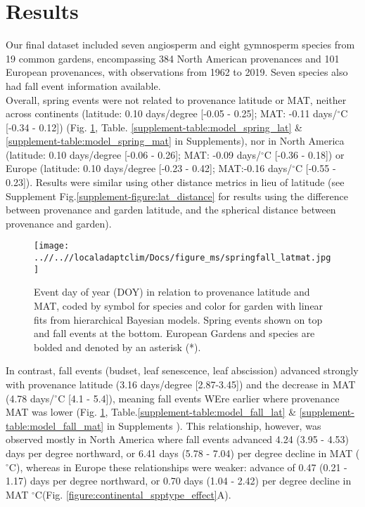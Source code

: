 \documentclass{article}
\begin{document}
\section{Results}
Our final dataset included seven angiosperm and eight gymnosperm species from 19 common gardens, encompassing 384 North American provenances and 101 European provenances, with observations from 1962 to 2019. Seven species also had fall event information available. 
\\

Overall, spring events were not related to provenance latitude or MAT, neither across continents (latitude: 0.10 days/degree [-0.05 - 0.25]; MAT: -0.11 days/$^{\circ}$C [-0.34 - 0.12]) (Fig. \ref{figure:springfall_latmat}, Table. \ref{supplement-table:model_spring_lat} \& \ref{supplement-table:model_spring_mat} in Supplements), nor in North America (latitude: 0.10 days/degree [-0.06 - 0.26]; MAT: -0.09 days/$^{\circ}$C [-0.36 - 0.18]) or Europe (latitude: 0.10 days/degree [-0.23 - 0.42]; MAT:-0.16 days/$^{\circ}$C [-0.55 - 0.23]). Results were similar using other distance metrics in lieu of latitude (see Supplement Fig.\ref{supplement-figure:lat_distance} for results using the difference between provenance and garden latitude, and the spherical distance between provenance and garden). \\

\begin{figure}[!h] 
    \centering
 \texttt{[image: ..//..//localadaptclim/Docs/figure\_ms/springfall\_latmat.jpg]}
    \caption{Event day of year (DOY) in relation to provenance latitude and MAT, coded by symbol for species and color for garden with linear fits from hierarchical Bayesian models. Spring events shown on top and fall events at the bottom. European Gardens and species are bolded and denoted by an asterisk (*). } 
    \label{figure:springfall_latmat}
\end{figure}


In contrast, fall events (budset, leaf senescence, leaf abscission) advanced strongly with provenance latitude (3.16 days/degree [2.87-3.45]) and the decrease in MAT (4.78 days/$^{\circ}$C [4.1 - 5.4]), meaning fall events WEre earlier where provenance MAT was lower (Fig. \ref{figure:springfall_latmat}, Table.\ref{supplement-table:model_fall_lat} \& \ref{supplement-table:model_fall_mat} in Supplements ). This relationship, however, was observed mostly in North America where fall events advanced 4.24 (3.95 - 4.53) days per degree northward, or 6.41 days (5.78 - 7.04) per degree decline in MAT ($^{\circ}$C), whereas in Europe these relationships were weaker: advance of 0.47 (0.21 - 1.17) days per degree northward, or 0.70 days (1.04 - 2.42) per degree decline in MAT $^{\circ}$C(Fig. \ref{figure:continental_spptype_effect}A). \\
\end{document}
